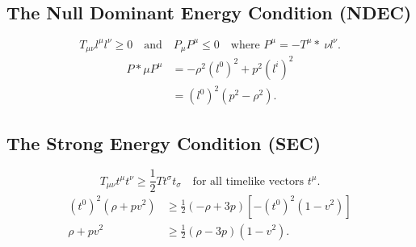 \documentclass[11pt, a4paper]{report}
\begin{document}
\subsection{The Null Dominant Energy Condition (NDEC)}
\begin{equation}
T_{\mu\nu} l^{\mu} l^{\nu} \ge 0 \quad \text{and} \quad P_{\mu}P^{\mu} \le 0 \quad \text{where } P^{\mu} = -T^{\mu}*{\ \nu} l^{\nu}.
\end{equation}
\begin{align}
P*{\mu}P^{\mu} &= -\rho^{2}(l^{0})^{2} + p^{2}(l^{i})^{2} \nonumber \\
&= (l^{0})^{2}(p^{2} - \rho^{2}).
\end{align}

\subsection{The Strong Energy Condition (SEC)}
\begin{equation}
T_{\mu\nu}t^{\mu}t^{\nu} \ge \frac{1}{2} T t^{\sigma}t_{\sigma} \quad \text{for all timelike vectors } t^{\mu}.
\end{equation}
\begin{align}
(t^{0})^{2}(\rho + p v^{2}) &\ge \frac{1}{2} (-\rho + 3p) \left[ -(t^{0})^{2}(1 - v^{2}) \right] \nonumber \\
\rho + p v^{2} &\ge \frac{1}{2} (\rho - 3p)(1 - v^{2}).
\end{align}
\end{document}
